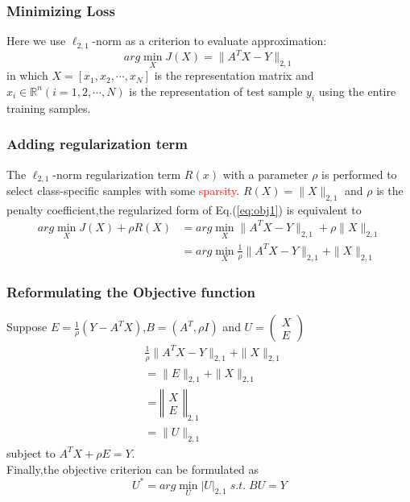 \documentclass{beamer}
\begin{document}
\begin{frame}\frametitle{Minimizing Loss}
Here we use $\ell_{2,1}$-norm as a criterion to evaluate approximation:
\begin{equation}\label{eq:obj1}
arg \min_X J(X)=\|A^TX-Y\|_{2,1}
\end{equation} 
in which $X=[x_1,x_2,\cdots ,x_N]$ is the representation matrix and $x_i\in \mathbb{R}^n(i=1,2,\cdots ,N)$ is the representation of test sample $y_i$ using the entire training samples.
\end{frame}

\begin{frame}\frametitle{Adding regularization term}
The $\ell_{2,1}$-norm regularization term $R(x)$ with a parameter $\rho$ is performed to select class-specific samples with some \textcolor{red}{sparsity}.
$R(X)=\|X\|_{2,1}$ and $\rho$ is the penalty coefficient,the regularized form of Eq.(\ref{eq:obj1}) is equivalent to
\begin{equation}\label{eq:obj2}
\begin{split}
arg \min_X J(X)+\rho R(X)&=arg \min_X\|A^TX-Y\|_{2,1}+\rho \|X\|_{2,1}\\
&=arg \min_X \frac{1}{\rho}\|A^TX-Y\|_{2,1}+\|X\|_{2,1}
\end{split}
\end{equation}
\end{frame}

\begin{frame}\frametitle{Reformulating the Objective function}
Suppose $E=\frac{1}{\rho}(Y-A^TX)$,$B=(A^T,\rho I)$ and $U=\left(\begin{array}{c}X\\E\end{array}\right)$
\begin{equation}\label{eq:obj3}
\begin{split}
&\frac{1}{\rho}\|A^TX-Y\|_{2,1}+\|X\|_{2,1}\\
&=\|E\|_{2,1}+\|X\|_{2,1}\\
&=\left\Vert\begin{array}{c}X\\E\end{array}\right\Vert_{2,1}\\
&=\|U\|_{2,1}
\end{split}
\end{equation}
subject to $A^TX+\rho E=Y$.\\
Finally,the objective criterion can be formulated as
\begin{equation}\label{eq:obj4}
U^*=arg \min_U \vert U\vert_{2,1}\;s.t.\;BU=Y
\end{equation}
\end{frame}
\end{document}

